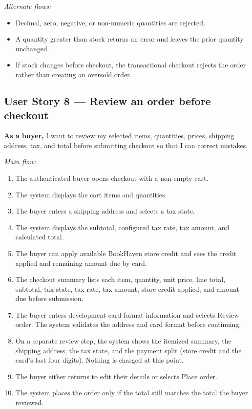 \documentclass[11pt]{scrreprt}
\begin{document}
\textit{Alternate flows:}
\begin{itemize}
\item Decimal, zero, negative, or non-numeric quantities are rejected.
\item A quantity greater than stock returns an error and leaves the prior
quantity unchanged.
\item If stock changes before checkout, the transactional checkout rejects the
order rather than creating an oversold order.
\end{itemize}

\subsection{User Story 8 --- Review an order before checkout}
\textbf{As a buyer,} I want to review my selected items, quantities, prices,
shipping address, tax, and total before submitting checkout so that I can
correct mistakes.

\textit{Main flow:}
\begin{enumerate}
\item The authenticated buyer opens checkout with a non-empty cart.
\item The system displays the cart items and quantities.
\item The buyer enters a shipping address and selects a tax state.
\item The system displays the subtotal, configured tax rate, tax amount, and
calculated total.
\item The buyer can apply available BookHaven store credit and sees the
credit applied and remaining amount due by card.
\item The checkout summary lists each item, quantity, unit price, line total,
subtotal, tax state, tax rate, tax amount, store credit applied, and amount
due before submission.
\item The buyer enters development card-format information and selects Review
order. The system validates the address and card format before continuing.
\item On a separate review step, the system shows the itemized summary, the
shipping address, the tax state, and the payment split (store credit and the
card's last four digits). Nothing is charged at this point.
\item The buyer either returns to edit their details or selects Place order.
\item The system places the order only if the total still matches the total
the buyer reviewed.
\end{enumerate}
\end{document}
